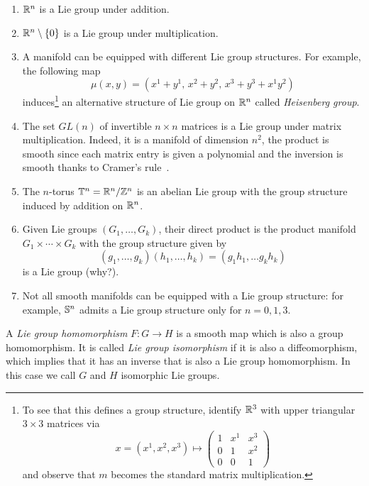 \begin{example}
  \begin{enumerate}
    \item $\mathbb{R}^n$ is a Lie group under addition.
    \item $\mathbb{R}^n\setminus\{0\}$ is a Lie group under multiplication.
    \item A manifold can be equipped with different Lie group structures. For example, the following map
    \begin{equation}
      \mu(x,y) = (x^1+y^1,\, x^2+y^2,\, x^3+y^3+x^1y^2)
    \end{equation}
    induces\footnote{To see that this defines a group structure, identify $\mathbb{R}^3$ with upper triangular $3\times3$ matrices via
    \begin{equation}\nonumber
      x = (x^1, x^2, x^3) \mapsto \begin{pmatrix}
        1 & x^1 & x^3\\
        0 & 1 & x^2 \\
        0 & 0 & 1
      \end{pmatrix}
    \end{equation}
    and observe that $m$ becomes the standard matrix multiplication.} an alternative structure of Lie group on $\mathbb{R}^n$ called \emph{Heisenberg group}.
    \item The set $GL(n)$ of invertible $n\times n$ matrices is a Lie group under matrix multiplication. Indeed, it is a manifold of dimension $n^2$, the product is smooth since each matrix entry is given a polynomial and the inversion is smooth thanks to Cramer's rule~\cite[Proposition B.36]{book:lee}.
    \item The $n$-torus $\mathbb{T}^n = \mathbb{R}^n/\mathbb{Z}^n$ is an abelian Lie group with the group structure induced by addition on $\mathbb{R}^n$.
    \item Given Lie groups $(G_1, \ldots, G_k)$, their direct product is the product manifold $G_1\times \cdots\times G_k$ with the group structure given by
    \begin{equation}
      (g_1, \ldots, g_k)(h_1,\ldots,h_k) = (g_1h_1, \ldots g_kh_k)
    \end{equation}
    is a Lie group (why?).
    \item Not all smooth manifolds can be equipped with a Lie group structure: for example, $\mathbb{S}^n$ admits a Lie group structure only for $n=0,1,3$.
  \end{enumerate}
\end{example}

\begin{definition}
  A \emph{Lie group homomorphism} $F:G\to H$ is a smooth map which is also a group homomorphism. It is called \emph{Lie group isomorphism} if it is also a diffeomorphism, which implies that it has an inverse that is also a Lie group homomorphism. In this case we call $G$ and $H$ isomorphic Lie groups.
\end{definition}

